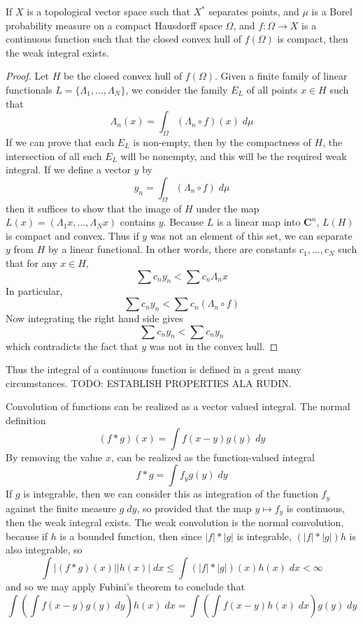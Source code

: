 \begin{theorem}
    If $X$ is a topological vector space such that $X^*$ separates points, and $\mu$ is a Borel probability measure on a compact Hausdorff space $\Omega$, and $f: \Omega \to X$ is a continuous function such that the closed convex hull of $f(\Omega)$ is compact, then the weak integral exists.
\end{theorem}
\begin{proof}
    Let $H$ be the closed convex hull of $f(\Omega)$. Given a finite family of linear functionals $L = \{ \Lambda_1, \dots, \Lambda_N \}$, we consider the family $E_L$ of all points $x \in H$ such that
    \[ \Lambda_n(x) = \int_\Omega (\Lambda_n \circ f)(x)\; d\mu \]
    If we can prove that each $E_L$ is non-empty, then by the compactness of $H$, the intersection of all such $E_L$ will be nonempty, and this will be the required weak integral. If we define a vector $y$ by
    \[ y_n = \int_\Omega (\Lambda_n \circ f)\; d\mu \]
    then it suffices to show that the image of $H$ under the map $L(x) = (\Lambda_1 x, \dots, \Lambda_N x)$ contains $y$. Because $L$ is a linear map into $\mathbf{C}^n$, $L(H)$ is compact and convex. Thus if $y$ was not an element of this set, we can separate $y$ from $H$ by a linear functional. In other words, there are constants $c_1, \dots, c_N$ such that for any $x \in H$,
    \[ \sum c_n y_n < \sum c_n \Lambda_n x \]
    In particular,
    \[ \sum c_n y_n < \sum c_n (\Lambda_n \circ f) \]
    Now integrating the right hand side gives
    \[ \sum c_n y_n < \sum c_n y_n \]
    which contradicts the fact that $y$ was not in the convex hull.
\end{proof}

Thus the integral of a continuous function is defined in a great many circumstances. TODO: ESTABLISH PROPERTIES ALA RUDIN.

\begin{example}
    Convolution of functions can be realized as a vector valued integral. The normal definition
    \[ (f * g)(x) = \int f(x - y) g(y)\; dy \]
    By removing the value $x$, can be realized as the function-valued integral
    \[ f * g = \int f_y g(y)\; dy \]
    If $g$ is integrable, then we can consider this as integration of the function $f_y$ against the finite measure $g\; dy$, so provided that the map $y \mapsto f_y$ is continuous, then the weak integral exists. The weak convolution is the normal convolution, because if $h$ is a bounded function, then since $|f| * |g|$ is integrable, $(|f| * |g|)h$ is also integrable, so
    \[ \int |(f * g)(x)| |h(x)|\; dx \leq \int (|f| * |g|)(x) h(x)\; dx < \infty \]
    and so we may apply Fubini's theorem to conclude that
    \[ \int \left( \int f(x-y) g(y)\; dy \right) h(x)\; dx = \int \left( \int f(x-y) h(x)\; dx \right) g(y)\; dy \]
\end{example}

